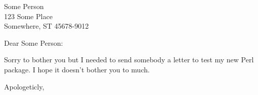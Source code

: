 \documentclass{letter}
\begin{document}
\newcommand{\email}[1]{$\langle$\texttt{#1}$\rangle$}

\address{\fromname\\
	 Baltimore, MD\\
	 \email{sven@zen.org}}

\signature{\fromname}

\begin{letter}{Some Person\\
               123 Some Place\\
               Somewhere, ST  45678-9012}

\opening{Dear Some Person:}

Sorry to bother you but I needed to send somebody a letter to test my
new Perl package.  I hope it doesn't bother you to much.

\closing{Apologeticly,}

\end{letter}
\end{document}
